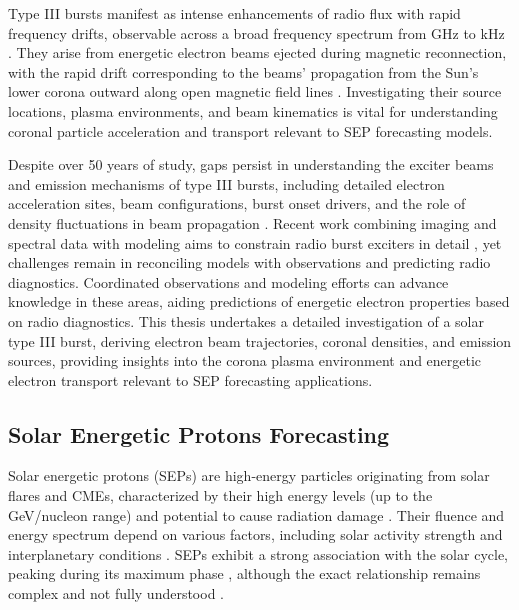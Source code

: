 Type III bursts manifest as intense enhancements of radio flux with rapid frequency drifts, observable across a broad frequency spectrum from GHz to kHz \citep{wild_1950a, lecacheux_1989, bonnin_2008}. They arise from energetic electron beams ejected during magnetic reconnection, with the rapid drift corresponding to the beams' propagation from the Sun's lower corona outward along open magnetic field lines \citep{cane_2002, macdowall_2003}. Investigating their source locations, plasma environments, and beam kinematics is vital for understanding coronal particle acceleration and transport relevant to SEP forecasting models.

Despite over 50 years of study, gaps persist in understanding the exciter beams and emission mechanisms of type III bursts, including detailed electron acceleration sites, beam configurations, burst onset drivers, and the role of density fluctuations in beam propagation \citep{reid_2018a, reid_2018b, li_2012a}. Recent work combining imaging and spectral data with modeling aims to constrain radio burst exciters in detail \citep{chen_2013b, kontar_2017}, yet challenges remain in reconciling models with observations and predicting radio diagnostics. Coordinated observations and modeling efforts can advance knowledge in these areas, aiding predictions of energetic electron properties based on radio diagnostics. This thesis undertakes a detailed investigation of a solar type III burst, deriving electron beam trajectories, coronal densities, and emission sources, providing insights into the corona plasma environment and energetic electron transport relevant to SEP forecasting applications.


\subsection{Solar Energetic Protons Forecasting}
Solar energetic protons (SEPs) are high-energy particles originating from solar flares and CMEs, characterized by their high energy levels (up to the GeV/nucleon range) and potential to cause radiation damage \citep{aschwanden_2002, lin_2005, reames_2013}. Their fluence and energy spectrum depend on various factors, including solar activity strength and interplanetary conditions \citep{kahler_1984, kahler_1987, debrunner_1988, miteva_2013, trottet_2015, dierckxsens_2015, le_2017, gopalswamy_2017}. SEPs exhibit a strong association with the solar cycle, peaking during its maximum phase \citep{reames_2013}, although the exact relationship remains complex and not fully understood \citep{nymmik_2007, ramstad_2018}.

